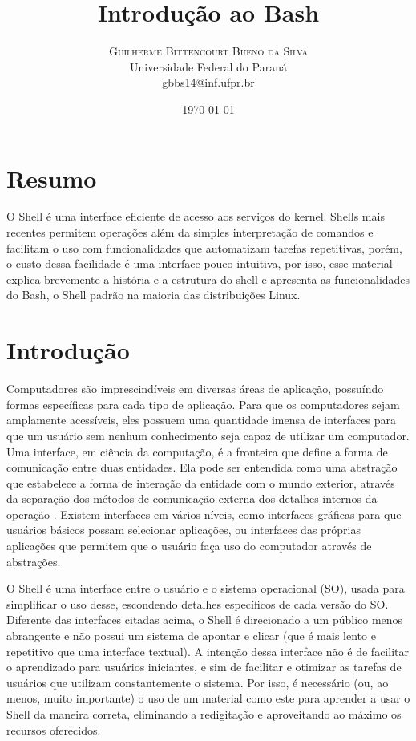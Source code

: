 \documentclass[oneside, 11 pt]{article}
\title{Introdução ao Bash} %
\author{%
	\textsc{Guilherme Bittencourt Bueno da Silva} \\[1ex] %
	\normalsize Universidade Federal do Paraná \\ %
	\normalsize {gbbs14@inf.ufpr.br} %
}
\date{\today} %
\begin{document}
	
	\maketitle
	\section{Resumo}
	 O Shell é uma interface eficiente de acesso aos serviços do kernel. Shells mais recentes permitem operações além da simples interpretação de comandos e facilitam o uso com funcionalidades que automatizam tarefas repetitivas, porém, o custo dessa facilidade é uma interface pouco intuitiva, por isso, esse material explica brevemente a história e a estrutura do shell e apresenta as funcionalidades do Bash, o Shell padrão na maioria das distribuições Linux.
	
	\section{Introdução}
	Computadores são imprescindíveis em  diversas áreas de aplicação, possuíndo formas específicas para cada tipo de aplicação. Para que os computadores sejam amplamente acessíveis, eles possuem uma quantidade imensa de interfaces para que um usuário sem nenhum conhecimento seja capaz de utilizar um computador. Uma interface, em ciência da computação, é a fronteira que define a forma de comunicação entre duas entidades. Ela pode ser entendida como uma abstração que estabelece a forma de interação da entidade com o mundo exterior, através da separação dos métodos de comunicação externa dos detalhes internos da operação \cite{interface}. Existem interfaces em vários níveis, como interfaces gráficas para que usuários básicos possam selecionar aplicações, ou interfaces das próprias aplicações que permitem que o usuário faça uso do computador através de abstrações.
	
	O Shell é uma interface entre o usuário e o sistema operacional (SO), usada para simplificar o uso desse, escondendo detalhes específicos de cada versão do SO. Diferente das interfaces citadas acima, o Shell é direcionado a um público menos abrangente e não possui um sistema de apontar e clicar (que é mais lento e repetitivo que uma interface textual). A intenção dessa interface não é de facilitar o aprendizado para usuários iniciantes, e sim de facilitar e otimizar as tarefas de usuários que utilizam constantemente o sistema. Por isso, é necessário (ou, ao menos, muito importante) o uso de um material como este para aprender a usar o Shell da maneira correta, eliminando a redigitação e aproveitando ao máximo os recursos oferecidos.
	
\end{document}
